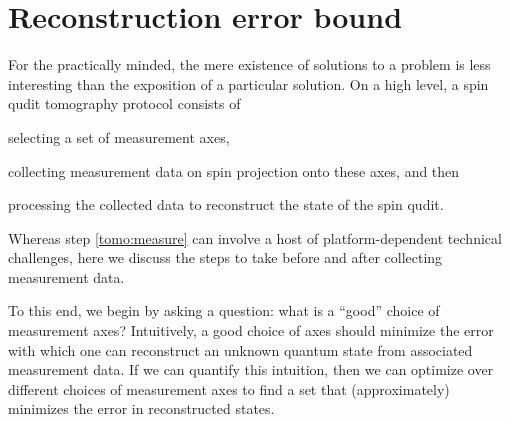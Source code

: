 \documentclass[notitlepage,twocolumn]{revtex4-2}
\begin{document}
\section{Reconstruction error bound}
\label{sec:bound}

For the practically minded, the mere existence of solutions to a problem is less interesting than the exposition of a particular solution.
On a high level, a spin qudit tomography protocol consists of
\begin{enumerate*}
\item selecting a set of measurement axes,
\item collecting measurement data on spin projection onto these axes, and then
  \label{tomo:measure}
\item processing the collected data to reconstruct the state of the spin qudit.
\end{enumerate*}
Whereas step \ref{tomo:measure} can involve a host of platform-dependent technical challenges, here we discuss the steps to take before and after collecting measurement data.

To this end, we begin by asking a question: what is a ``good'' choice of measurement axes?
Intuitively, a good choice of axes should minimize the error with which one can reconstruct an unknown quantum state from associated measurement data.
If we can quantify this intuition, then we can optimize over different choices of measurement axes to find a set that (approximately) minimizes the error in reconstructed states.
\end{document}
